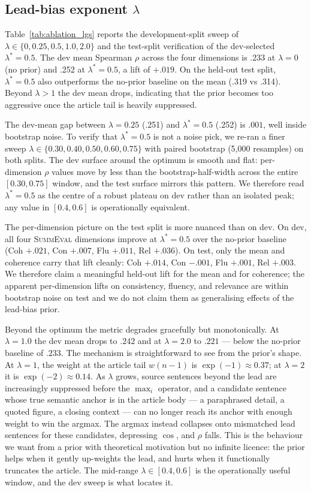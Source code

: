\documentclass[journal]{IEEEtran}
\begin{document}
\subsection{Lead-bias exponent $\lambda$}
\label{sec:ablation-lambda}
Table~\ref{tab:ablation_lgs} reports the development-split sweep of
$\lambda \in \{0, 0.25, 0.5, 1.0, 2.0\}$ and the test-split
verification of the dev-selected $\lambda^* = 0.5$. The dev mean
Spearman $\rho$ across the four dimensions is .233 at $\lambda=0$
(no prior) and .252 at $\lambda^*=0.5$, a lift of $+.019$. On the
held-out test split, $\lambda^*=0.5$ also outperforms the no-prior
baseline on the mean (.319 vs .314). Beyond $\lambda > 1$ the
dev mean drops, indicating that the prior becomes too aggressive
once the article tail is heavily suppressed.

The dev-mean gap between $\lambda=0.25$ (.251) and $\lambda^*=0.5$
(.252) is $.001$, well inside bootstrap noise. To verify that
$\lambda^*=0.5$ is not a noise pick, we re-ran a finer sweep
$\lambda \in \{0.30, 0.40, 0.50, 0.60, 0.75\}$ with paired
bootstrap (5{,}000 resamples) on both splits. The dev surface
around the optimum is smooth and flat: per-dimension $\rho$ values
move by less than the bootstrap-half-width across the entire
$[0.30, 0.75]$ window, and the test surface mirrors this pattern.
We therefore read $\lambda^*=0.5$ as the centre of a robust
plateau on dev rather than an isolated peak; any value in
$[0.4, 0.6]$ is operationally equivalent.

The per-dimension picture on the test split is more nuanced than
on dev. On dev, all four \textsc{SummEval} dimensions improve at
$\lambda^*=0.5$ over the no-prior baseline (Coh $+.021$, Con
$+.007$, Flu $+.011$, Rel $+.036$). On test, only the mean and
coherence carry that lift cleanly: Coh $+.014$, Con $-.001$,
Flu $+.001$, Rel $+.003$. We therefore claim a meaningful
held-out lift for the mean and for coherence; the apparent
per-dimension lifts on consistency, fluency, and relevance are
within bootstrap noise on test and we do not claim them as
generalising effects of the lead-bias prior.

Beyond the optimum the metric degrades gracefully but
monotonically. At $\lambda{=}1.0$ the dev mean drops to $.242$
and at $\lambda{=}2.0$ to $.221$ --- below the no-prior baseline
of $.233$. The mechanism is straightforward to see from the
prior's shape. At $\lambda{=}1$, the weight at the article tail
$w(n{-}1)$ is $\exp(-1)\approx 0.37$; at $\lambda{=}2$ it is
$\exp(-2)\approx 0.14$. As $\lambda$ grows, source sentences
beyond the lead are increasingly suppressed before the $\max_i$
operator, and a candidate sentence whose true semantic anchor is
in the article body --- a paraphrased detail, a quoted figure,
a closing context --- can no longer reach its anchor with enough
weight to win the argmax. The argmax instead collapses onto
mismatched lead sentences for these candidates, depressing
$\cos$, and $\rho$ falls. This is the behaviour we want from a
prior with theoretical motivation but no infinite licence: the
prior helps when it gently up-weights the lead, and hurts when
it functionally truncates the article. The mid-range
$\lambda \in [0.4, 0.6]$ is the operationally useful window,
and the dev sweep is what locates it.
\end{document}
